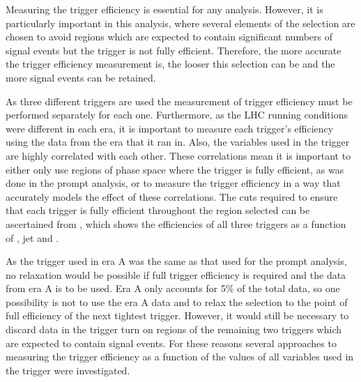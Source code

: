 Measuring the trigger efficiency is essential for any analysis. However, it is particularly important in this analysis, where several elements of the selection are chosen to avoid regions which are expected to contain significant numbers of signal events but the trigger is not fully efficient. Therefore, the more accurate the trigger efficiency measurement is, the looser this selection can be and the more signal events can be retained.

As three different triggers are used the measurement of trigger efficiency must be performed separately for each one. Furthermore, as the LHC running conditions were different in each era, it is important to measure each trigger's efficiency using the data from the era that it ran in. Also, the variables used in the trigger are highly correlated with each other. These correlations mean it is important to either only use regions of phase space where the trigger is fully efficient, as was done in the prompt analysis, or to measure the trigger efficiency in a way that accurately models the effect of these correlations. The cuts required to ensure that each trigger is fully efficient throughout the region selected can be ascertained from , which shows the efficiencies of all three triggers as a function of \METnoMU, jet \pt and \Mjj.

As the trigger used in era A was the same as that used for the prompt analysis, no relaxation would be possible if full trigger efficiency is required and the data from era A is to be used. Era A only accounts for 5\% of the total data, so one possibility is not to use the era A data and to relax the selection to the point of full efficiency of the next tightest trigger. However, it would still be necessary to discard data in the trigger turn on regions of the remaining two triggers which are expected to contain signal events. For these reasons several approaches to measuring the trigger efficiency as a function of the values of all variables used in the trigger were investigated.

